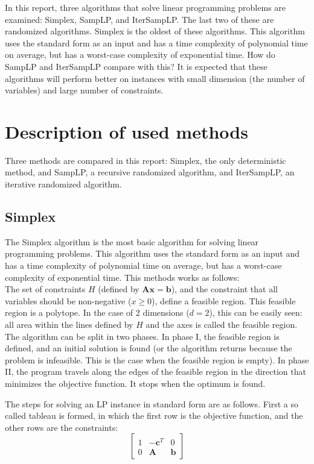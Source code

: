 \documentclass[nocopyrightspace]{acm_proc_article-sp}
\begin{document}
In this report, three algorithms that solve linear programming problems are examined: Simplex, SampLP, and IterSampLP. The last two of these are randomized algorithms. Simplex is the oldest of these algorithms. This algorithm uses the standard form as an input and has a time complexity of polynomial time on average, but has a worst-case complexity of exponential time. How do SampLP and IterSampLP compare with this? It is expected that these algorithms will perform better on instances with small dimension (the number of variables) and large number of constraints. 

\section{Description of used methods}
Three methods are compared  in this report: Simplex, the only deterministic method, and SampLP, a recursive randomized algorithm, and IterSampLP, an iterative randomized algorithm.
\subsection{Simplex}
The Simplex algorithm \cite{dantzig1951maximization} is the most basic algorithm for solving linear programming problems. This algorithm uses the standard form as an input and has a time complexity of polynomial time on average, but has a worst-case complexity of exponential time. This methods works as follows: \\
The set of constraints $H$ (defined by $\mathbf{Ax} = \mathbf{b}$), and the constraint that all variables should be non-negative ($x \geq 0$), define a feasible region. This feasible region is a polytope. In the case of 2 dimensions ($d=2$), this can be easily seen: all area within the lines defined by $H$ and the axes is called the feasible region. \\
The algorithm can be split in two phases. In phase I, the feasible region is defined, and an initial solution is found (or the algorithm returns because the problem is infeasible. This is the case when the feasible region is empty). In phase II, the program travels along the edges of the feasible region in the direction that minimizes the objective function. It stops when the optimum is found.

The steps for solving an LP instance in standard form are as follows. First a so called tableau is formed, in which the first row is the objective function, and the other rows are the constraints:
\[
\begin{bmatrix}
1 & -\mathbf{c}^T & 0 \\
0 & \mathbf{A} & \mathbf{b}
\end{bmatrix} \]
\end{document}
